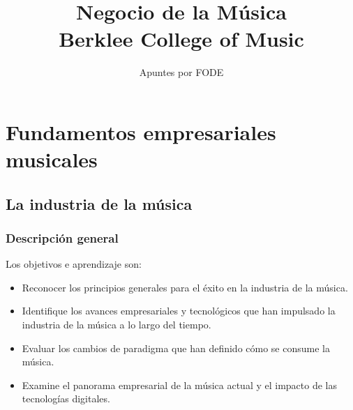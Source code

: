 \documentclass[10pt]{book}
\begin{document}
\normalfont

\author{\Large Apuntes por FODE}
\title{Negocio de la Música \vspace{0.5cm} \\ \small Berklee College of Music}
\date{}
\pagestyle{empty}
\maketitle
\thispagestyle{empty}
\let\cleardoublepage\clearpage
\tableofcontents 								%

 
\let\cleardoublepage\clearpage
\part{Fundamentos empresariales musicales}
\let\cleardoublepage\clearpage
\chapter{La industria de la música}
\section{Descripción general}
Los objetivos e aprendizaje son:
\begin{itemize}
\item Reconocer los principios generales para el éxito en la industria de la música.
\item Identifique los avances empresariales y tecnológicos que han impulsado la industria de la música a lo largo del tiempo.
\item Evaluar los cambios de paradigma que han definido cómo se consume la música.
\item Examine el panorama empresarial de la música actual y el impacto de las tecnologías digitales.
\end{itemize}
\end{document}
